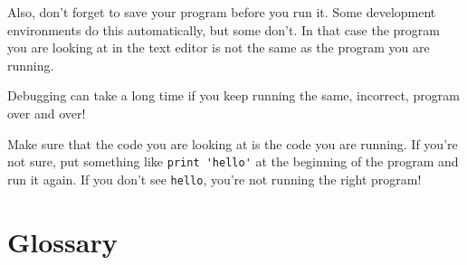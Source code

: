 \documentclass[10pt]{book}
\begin{document}
Also, don't forget to save your program before you run it.  Some
development environments do this automatically, but some don't.
In that case the program you are looking at in the text editor
is not the same as the program you are running.

Debugging can take a long time if you keep running the same,
incorrect, program over and over!

Make sure that the code you are looking at is the code you are running.
If you're not sure, put something like \verb"print 'hello'" at the
beginning of the program and run it again.  If you don't see
\verb"hello", you're not running the right program!




\section{Glossary}
\end{document}
